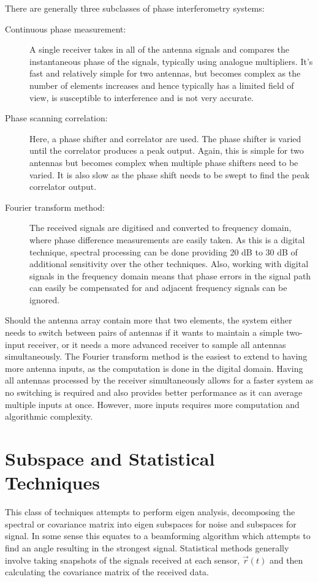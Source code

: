 There are generally three subclasses of phase interferometry systems\cite{jenkins1991smallaperture}:
\begin{description}
  \item [Continuous phase measurement:] A single receiver takes in all of the antenna signals and compares the instantaneous phase of the signals, typically using analogue multipliers. It's fast and relatively simple for two antennas, but becomes complex as the number of elements increases and hence typically has a limited field of view, is susceptible to interference and is not very accurate.
  \item [Phase scanning correlation:] Here, a phase shifter and correlator are used. The phase shifter is varied until the correlator produces a peak output. Again, this is simple for two antennas but becomes complex when multiple phase shifters need to be varied. It is also slow as the phase shift needs to be swept to find the peak correlator output.
  \item [Fourier transform method:] The received signals are digitised and converted to frequency domain, where phase difference measurements are easily taken. As this is a digital technique, spectral processing can be done providing 20 dB to 30 dB of additional sensitivity over the other techniques. Also, working with digital signals in the frequency domain means that phase errors in the signal path can easily be compensated for and adjacent frequency signals can be ignored.
\end{description}
Should the antenna array contain more that two elements, the system either needs to switch between pairs of antennas if it wants to maintain a simple two-input receiver, or it needs a more advanced receiver to sample all antennas simultaneously. The Fourier transform method is the easiest to extend to having more antenna inputs, as the computation is done in the digital domain. Having all antennas processed by the receiver simultaneously allows for a faster system as no switching is required and also provides better performance as it can average multiple inputs at once. However, more inputs requires more computation and algorithmic complexity.

\section{Subspace and Statistical Techniques}
This class of techniques attempts to perform eigen analysis, decomposing the spectral or covariance matrix into eigen subspaces for noise and subspaces for signal. In some sense this equates to a beamforming algorithm which attempts to find an angle resulting in the strongest signal. 
Statistical methods generally involve taking snapshots of the signals received at each sensor, \(\vec{r}(t)\) and then calculating the covariance matrix of the received data\cite{poisel2012electronic}.

